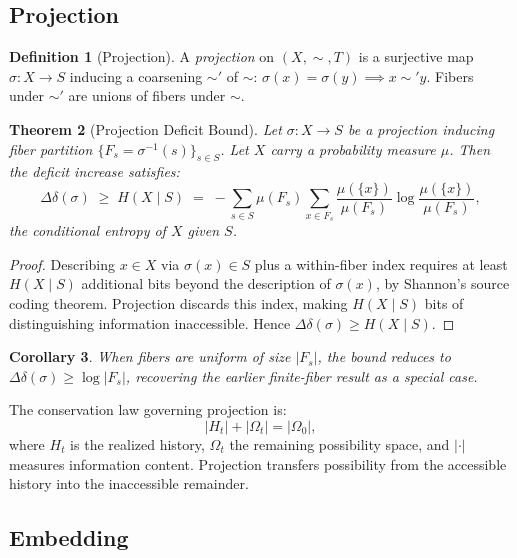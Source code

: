 \documentclass[12pt, a4paper]{article}
\theoremstyle{plain}
\newtheorem{theorem}{Theorem}[section]
\newtheorem{corollary}[theorem]{Corollary}
\theoremstyle{definition}
\newtheorem{definition}[theorem]{Definition}
\theoremstyle{remark}
\newcommand{\Ddelta}{\Delta\delta}
\begin{document}
\subsection{Projection}

\begin{definition}[Projection]
A \emph{projection} on $(X,\sim,T)$ is a surjective map $\sigma:X\to S$
inducing a coarsening $\sim'$ of $\sim$: $\sigma(x)=\sigma(y)\implies x\sim'y$.
Fibers under $\sim'$ are unions of fibers under $\sim$.
\end{definition}

\begin{theorem}[Projection Deficit Bound]
\label{thm:proj-deficit}
Let $\sigma:X\to S$ be a projection inducing fiber partition
$\{F_s=\sigma^{-1}(s)\}_{s\in S}$. Let $X$ carry a probability measure $\mu$.
Then the deficit increase satisfies:
\[
  \Ddelta(\sigma) \;\ge\; H(X\mid S)
  \;=\; -\sum_{s\in S}\mu(F_s)\sum_{x\in F_s}\frac{\mu(\{x\})}{\mu(F_s)}
  \log\frac{\mu(\{x\})}{\mu(F_s)},
\]
the conditional entropy of $X$ given $S$.
\end{theorem}

\begin{proof}
Describing $x\in X$ via $\sigma(x)\in S$ plus a within-fiber index requires
at least $H(X\mid S)$ additional bits beyond the description of $\sigma(x)$,
by Shannon's source coding theorem. Projection discards this index, making
$H(X\mid S)$ bits of distinguishing information inaccessible. Hence
$\Ddelta(\sigma)\ge H(X\mid S)$.
\end{proof}

\begin{corollary}
When fibers are uniform of size $|F_s|$, the bound reduces to
$\Ddelta(\sigma)\ge\log|F_s|$, recovering the earlier finite-fiber result
as a special case.
\end{corollary}

The conservation law governing projection is:
\begin{equation}
  |H_t| + |\Omega_t| = |\Omega_0|,
  \label{eq:conservation}
\end{equation}
where $H_t$ is the realized history, $\Omega_t$ the remaining possibility
space, and $|\cdot|$ measures information content. Projection transfers
possibility from the accessible history into the inaccessible remainder.

\subsection{Embedding}
\end{document}
